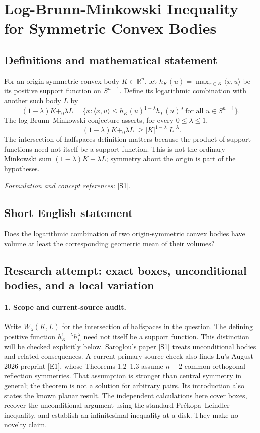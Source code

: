 \documentclass[11pt]{article}
\begin{document}
\section*{\texorpdfstring{Log-Brunn-Minkowski Inequality for Symmetric Convex Bodies}{Log-Brunn-Minkowski Inequality for Symmetric Convex Bodies}}\label{345}
\subsection{Definitions and mathematical statement}
For an origin-symmetric convex body $K\subset{\mathbb{R}}^n$, let $h_K(u)=\max_{x\in K}\langle x,u\rangle$ be its positive support function on $S^{n-1}$. Define its logarithmic combination with another such body $L$ by
\[
 (1-\lambda)K+_0\lambda L
 =\{x:\langle x,u\rangle\le
 h_K(u)^{1-\lambda}h_L(u)^\lambda\ \text{for all }u\in S^{n-1}\}.
\]
The log-Brunn--Minkowski conjecture asserts, for every $0\le\lambda\le1$,
\[
 |(1-\lambda)K+_0\lambda L|\ge |K|^{1-\lambda}|L|^\lambda.
\]
The intersection-of-halfspaces definition matters because the product of support functions need not itself be a support function. This is not the ordinary Minkowski sum $(1-\lambda)K+\lambda L$; symmetry about the origin is part of the hypotheses.
\par\smallskip\textit{Formulation and concept references:} \href{https://arxiv.org/abs/1311.4954}{[S1]}.

\subsection{Short English statement}
Does the logarithmic combination of two origin-symmetric convex bodies have volume at least the corresponding geometric mean of their volumes?
\subsection{Research attempt: exact boxes, unconditional bodies, and a local variation}
\paragraph{1. Scope and current-source audit.}
Write $W_\lambda(K,L)$ for the intersection of halfspaces in the question. The defining positive function $h_K^{1-\lambda}h_L^\lambda$ need not itself be a support function. This distinction will be checked explicitly below. Saroglou's paper [S1] treats unconditional bodies and related consequences. A current primary-source check also finds Lu's August 2026 preprint [E1], whose Theorems 1.2--1.3 assume $n-2$ common orthogonal reflection symmetries. That assumption is stronger than central symmetry in general; the theorem is not a solution for arbitrary pairs. Its introduction also states the known planar result. The independent calculations here cover boxes, recover the unconditional argument using the standard Pr\'ekopa--Leindler inequality, and establish an infinitesimal inequality at a disk. They make no novelty claim.
\end{document}
